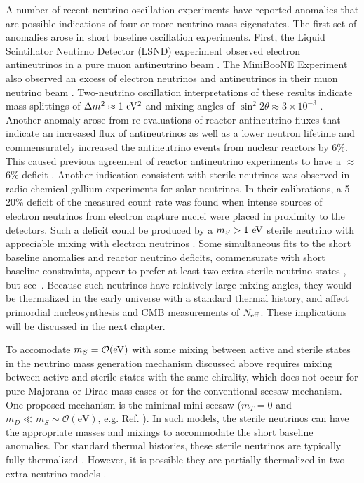 A number of recent neutrino oscillation experiments have reported anomalies
that are possible indications of four or more neutrino mass eigenstates. The
first set of anomalies arose in short baseline oscillation experiments.
First, the Liquid Scintillator Neutirno Detector (LSND) experiment observed
electron antineutrinos in a pure muon antineutrino
beam \cite{Athanassopoulos:1997pv}. The MiniBooNE Experiment also observed
an excess of electron neutrinos and antineutrinos in their muon
neutrino beam \cite{Aguilar-Arevalo:2013pmq}. Two-neutrino oscillation
interpretations of these results indicate mass splittings of $\Delta m^2
\approx 1\rm\ eV^2$ and mixing angles of $\sin^2 2\theta \approx
3\times 10^{-3}$ \cite{Aguilar-Arevalo:2013pmq}. Another anomaly
arose from re-evaluations of reactor antineutrino fluxes that
indicate an increased flux of antineutrinos as well as a lower
neutron lifetime and commensurately increased the antineutrino events
from nuclear reactors by 6\%. This caused previous agreement of
reactor antineutrino experiments to have a $\approx$6\% deficit
\cite{Mention:2011rk,Huber:2011wv}. Another indication consistent with
sterile neutrinos was observed in radio-chemical gallium experiments for solar
neutrinos. In their calibrations, a 5-20\% deficit of the measured
count rate was found when intense sources of electron neutrinos from
electron capture nuclei were placed in proximity to the
detectors. Such a deficit could be produced by a $m_S >1\rm\ eV$ sterile
neutrino with appreciable mixing with electron neutrinos
\cite{Bahcall:1994bq,Giunti:2010zu}. Some simultaneous fits to the
short baseline anomalies and reactor neutrino deficits, commensurate
with short baseline constraints, appear to prefer at least two extra
sterile neutrino states \cite{Conrad:2012qt,Kopp:2013vaa}, but see~\cite{Giunti:2015mwa}. Because such neutrinos have relatively
large mixing angles, they would be thermalized in the early universe
with a standard thermal history, and affect primordial nucleosynthesis
\cite{Abazajian:2002bj} and CMB measurements of $N_{\rm eff}$.  These implications will be discussed in the next chapter.

To accomodate $m_S = \mathcal{O}({\rm eV})$ with some mixing between active
and sterile states in the neutrino mass generation mechanism discussed
above requires mixing between active and sterile states with the same
chirality, which does not occur for pure Majorana or Dirac mass cases
or for the conventional seesaw mechanism. One proposed mechanism is
the minimal mini-seesaw ($m_T =0$ and $m_D\ll
m_S\sim\mathcal{O}(\mathrm{eV})$,
e.g. Ref.\cite{deGouvea:2011zz,Donini:2012tt} ). In such models, the
sterile neutrinos can have the appropriate masses and mixings to
accommodate the short baseline anomalies. For standard thermal
histories, these sterile neutrinos are typically fully thermalized
\cite{Abazajian:2002bj}. However, it is possible they are partially
thermalized in two extra neutrino models \cite{Jacques:2013xr}.

